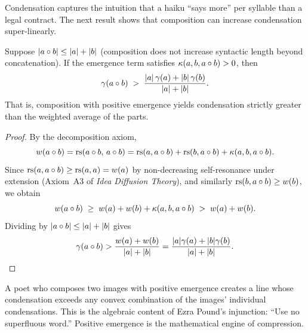 Condensation captures the intuition that a haiku ``says more'' per
syllable than a legal contract.  The next result shows that
composition can increase condensation super-linearly.

\begin{theorem}
\label{thm:superlinear-condensation}
Suppose $|a \circ b| \le |a| + |b|$ (composition does not
increase syntactic length beyond concatenation).  If the emergence
term satisfies $\kappa(a,b,a \circ b) > 0$, then
\[
  \gamma(a \circ b)
  \;>\;
  \frac{|a|\,\gamma(a) + |b|\,\gamma(b)}{|a|+|b|}.
\]
That is, composition with positive emergence yields condensation
strictly greater than the weighted average of the parts.
\end{theorem}

\begin{proof}
By the decomposition axiom,
\[
  w(a \circ b)
  = \mathrm{rs}(a \circ b,\, a \circ b)
  = \mathrm{rs}(a, a\circ b) + \mathrm{rs}(b, a\circ b)
    + \kappa(a,b,a\circ b).
\]
Since $\mathrm{rs}(a, a\circ b) \ge \mathrm{rs}(a,a) = w(a)$ by non-decreasing
self-resonance under extension (Axiom~A3 of \emph{Idea Diffusion Theory}), and
similarly $\mathrm{rs}(b, a\circ b) \ge w(b)$, we obtain
\[
  w(a \circ b)
  \;\ge\; w(a) + w(b) + \kappa(a,b,a\circ b)
  \;>\; w(a) + w(b).
\]
Dividing by $|a \circ b| \le |a|+|b|$ gives
\[
  \gamma(a \circ b)
  > \frac{w(a)+w(b)}{|a|+|b|}
  = \frac{|a|\gamma(a)+|b|\gamma(b)}{|a|+|b|}. \qedhere
\]
\end{proof}

\begin{interpretation}
A poet who composes two images with positive emergence creates a
line whose condensation exceeds any convex combination of the
images' individual condensations.  This is the algebraic content
of Ezra Pound's injunction: ``Use no superfluous word.''  Positive
emergence is the mathematical engine of compression.
\end{interpretation}

